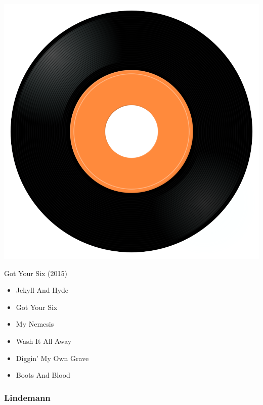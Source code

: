 \begin{minipage}[t]{0.25\textwidth}
\captionsetup{type=figure}
\includegraphics[width=\textwidth]{Images/cover.png}
\caption*{Got Your Six (2015)}
\end{minipage}
\begin{minipage}[t]{0.25\textwidth}\vspace{0pt}
\begin{itemize}[nosep,leftmargin=1em,labelwidth=*,align=left]
	\setlength{\itemsep}{0pt}
	\item Jekyll And Hyde
	\item Got Your Six
	\item My Nemesis
	\item Wash It All Away
	\item Diggin' My Own Grave
	\item Boots And Blood
\end{itemize}
\end{minipage}

\subsubsection{Lindemann}

